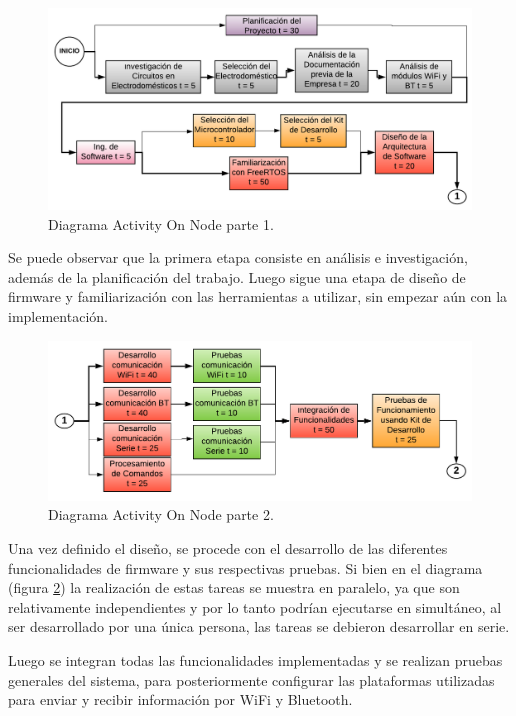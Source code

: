\begin{figure}[h]
\centering
\includegraphics[width=\textwidth]{./Figures/activity_on_node_1.pdf}
\caption{Diagrama Activity On Node parte 1.}
\label{fig:activity_on_node_1}
\end{figure}

Se puede observar que la primera etapa consiste en análisis e investigación, además de la planificación del trabajo. Luego sigue una etapa de diseño de firmware y familiarización con las herramientas a utilizar, sin empezar aún con la implementación.

\begin{figure}[h]
\centering
\includegraphics[width=\textwidth]{./Figures/activity_on_node_2.pdf}
\caption{Diagrama Activity On Node parte 2.}
\label{fig:activity_on_node_2}
\end{figure}

Una vez definido el diseño, se procede con el desarrollo de las diferentes funcionalidades de firmware y sus respectivas pruebas. Si bien en el diagrama (figura \ref{fig:activity_on_node_2}) la realización de estas tareas se muestra en paralelo, ya que son relativamente independientes y por lo tanto podrían ejecutarse en simultáneo, al ser desarrollado por una única persona, las tareas se debieron desarrollar en serie.

Luego se integran todas las funcionalidades implementadas y se realizan pruebas generales del sistema, para posteriormente configurar las plataformas utilizadas para enviar y recibir información por WiFi y Bluetooth.

